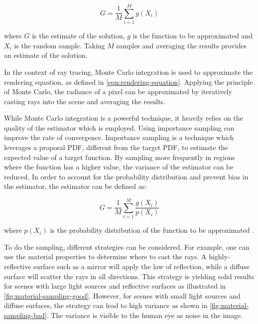 \begin{equation}
  G = \frac{1}{M}\sum_{i=1}^M g(X_i)
  \label{eq:monteCarlo}
\end{equation}

where $G$ is the estimate of the solution, $g$ is the function to be approximated and $X_i$ is the random sample. Taking $M$ samples and averaging the results provides an estimate of the solution. \cite{kalos2009monte}

In the context of ray tracing, Monte Carlo integration is used to approximate the rendering equation, as defined in \autoref{eqn:rendering-equation}. Applying the principle of Monte Carlo, the radiance of a pixel can be approximated by iteratively casting rays into the scene and averaging the results. 

While Monte Carlo integration is a powerful technique, it heavily relies on the quality of the estimator which is employed. Using importance sampling can improve the rate of convergence. Importance sampling is a technique which leverages a proposal \gls{PDF}, different from the target \gls{PDF}, to estimate the expected value of a target function. By sampling more frequently in regions where the function has a higher value, the variance of the estimator can be reduced. In order to account for the probability distribution and prevent bias in the estimator, the estimator can be defined as:

\begin{equation}
  G = \frac{1}{M}\sum_{i=1}^M \frac{g(X_i)}{p(X_i)}
  \label{eq:importanceSampling}
\end{equation}

where $p(X_i)$ is the probability distribution of the function to be approximated \cite{Pharr_Physically_Based_Rendering_2023}.

To do the sampling, different strategies can be considered. For example, one can use the material properties to determine where to cast the rays. A highly-reflective surface such as a mirror will apply the law of reflection, while a diffuse surface will scatter the rays in all directions. This strategy is yielding solid results for scenes with large light sources and reflective surfaces as illustrated in \autoref{fig:material-sampling-good}. However, for scenes with small light sources and diffuse surfaces, the strategy can lead to high variance as shown in \autoref{fig:material-sampling-bad}. The variance is visible to the human eye as noise in the image.

